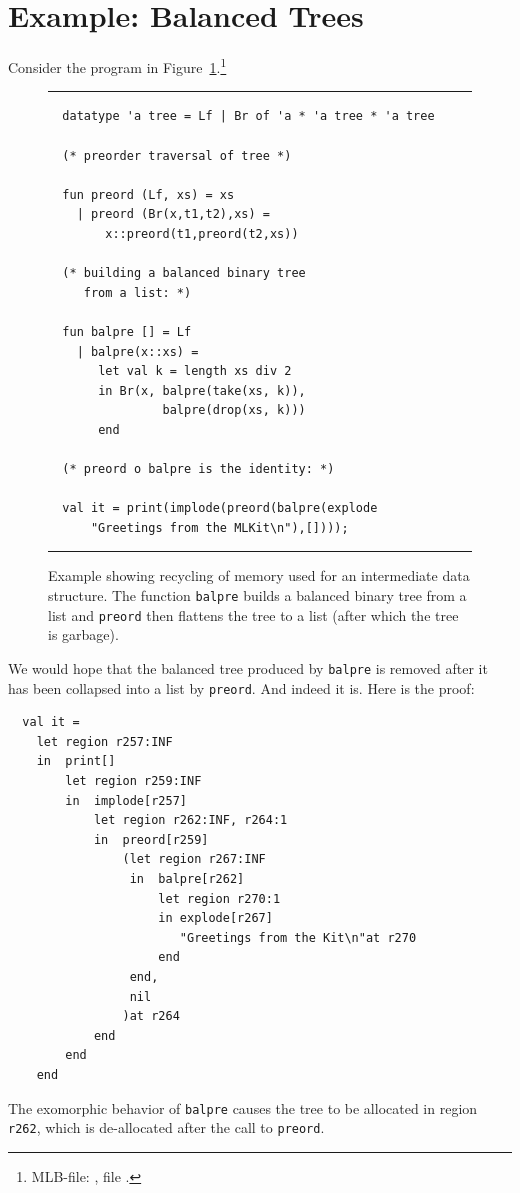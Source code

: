 \documentclass[12pt]{book}
\begin{document}
\section{Example: Balanced Trees}
Consider the program in Figure~\ref{balpre.fig}.\footnote{MLB-file:
  , file .}
\begin{figure}
\hrule
\medskip
\begin{verbatim}
  datatype 'a tree = Lf | Br of 'a * 'a tree * 'a tree

  (* preorder traversal of tree *)

  fun preord (Lf, xs) = xs
    | preord (Br(x,t1,t2),xs) =
        x::preord(t1,preord(t2,xs))

  (* building a balanced binary tree
     from a list: *)

  fun balpre [] = Lf
    | balpre(x::xs) =
       let val k = length xs div 2
       in Br(x, balpre(take(xs, k)),
                balpre(drop(xs, k)))
       end

  (* preord o balpre is the identity: *)

  val it = print(implode(preord(balpre(explode
      "Greetings from the MLKit\n"),[])));
\end{verbatim}
\caption{Example showing recycling of memory used for an intermediate
  data structure. The function {\tt balpre} builds a balanced binary
  tree from a list and {\tt preord} then flattens the tree to a list
  (after which the tree is garbage).}
\medskip \hrule
\label{balpre.fig}
\end{figure}
We would hope that the balanced tree produced by {\tt balpre} is
removed after it has been collapsed into a list by {\tt preord}.  And
indeed it is. Here is the proof:
\begin{verbatim}
  val it =
    let region r257:INF
    in  print[]
        let region r259:INF
        in  implode[r257]
            let region r262:INF, r264:1
            in  preord[r259]
                (let region r267:INF
                 in  balpre[r262]
                     let region r270:1
                     in explode[r267]
                        "Greetings from the Kit\n"at r270
                     end
                 end,
                 nil
                )at r264
            end
        end
    end
\end{verbatim}
The exomorphic behavior of {\tt balpre} causes the tree to be
allocated in region {\tt r262}, which is
de-allocated after the call to {\tt preord}.
\end{document}
